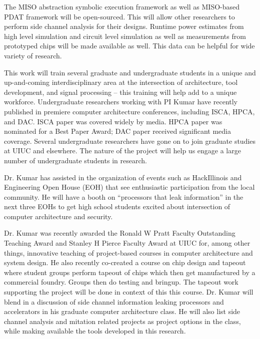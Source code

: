 \color{red}
The MISO abstraction symbolic execution framework as well as MISO-based PDAT
framework will be open-sourced. This will allow other researchers to perform
side channel analysis for their designs.  Runtime power estimates from high
level simulation and circuit level simulation as well as measurements from
prototyped chips will be made available as well. This data can be helpful for
wide variety of research.

This work will train several graduate and undergraduate students in a unique
and up-and-coming interdisciplinary area at the intersection of architecture,
tool development, and signal processing – this training will help add to a
unique workforce.  Undergraduate researchers working with PI Kumar have
recently published in premiere computer architecture conferences, including
ISCA, HPCA, and DAC. ISCA paper was covered widely by media. HPCA paper was
nominated for a Best Paper Award; DAC paper received significant media
coverage. Several undergraduate researchers have gone on to join graduate
studies at UIUC and elsewhere. The nature of the project will help us engage a
large number of undergraduate students in research.

Dr. Kumar has assisted in the organization of events such as HackIllinois and
Engineering Open House (EOH) that see enthusiastic participation from the local
community. He will have a booth on “processors that leak information” in the
next three EOHs to get high school students excited about intersection of
computer architecture and security.

Dr. Kumar was recently awarded the Ronald W Pratt Faculty Outstanding Teaching
Award and Stanley H Pierce Faculty Award at UIUC for, among other things,
innovative teaching of project-based courses in computer architecture and
system design. He also recently co-created a course on chip design and tapeout
where student groups perform tapeout of chips which then get manufactured by a
commercial foundry. Groups then do testing and bringup. The tapeout work
supporting the project will be done in context of this this course. Dr. Kumar
will blend in a discussion of side channel information leaking processors and
accelerators in his graduate computer architecture class. He will also list
side channel analysis and mitation related projects as project options in the
class, while making available the tools developed in this research.
\color{black}

